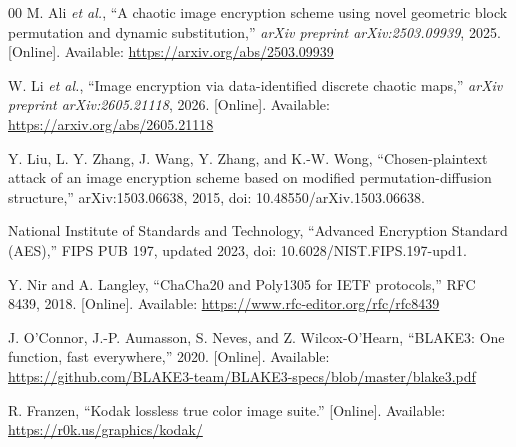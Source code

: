 \documentclass[twocolumn,runningheads]{svjour3}
\begin{document}
\begin{thebibliography}{00}
 M. Ali \emph{et al.}, ``A chaotic image encryption scheme
using novel geometric block permutation and dynamic substitution,''
\emph{arXiv preprint arXiv:2503.09939}, 2025. [Online]. Available:
\url{https://arxiv.org/abs/2503.09939}

 W. Li \emph{et al.}, ``Image encryption via data-identified
discrete chaotic maps,'' \emph{arXiv preprint arXiv:2605.21118}, 2026.
[Online]. Available: \url{https://arxiv.org/abs/2605.21118}

 Y. Liu, L. Y. Zhang, J. Wang, Y. Zhang, and K.-W. Wong,
``Chosen-plaintext attack of an image encryption scheme based on modified
permutation-diffusion structure,'' arXiv:1503.06638, 2015,
doi: 10.48550/arXiv.1503.06638.

 National Institute of Standards and Technology,
``Advanced Encryption Standard (AES),'' FIPS PUB 197, updated 2023,
doi: 10.6028/NIST.FIPS.197-upd1.

 Y. Nir and A. Langley, ``ChaCha20 and Poly1305 for IETF
protocols,'' RFC 8439, 2018. [Online]. Available:
\url{https://www.rfc-editor.org/rfc/rfc8439}

 J. O'Connor, J.-P. Aumasson, S. Neves, and
Z. Wilcox-O'Hearn, ``BLAKE3: One function, fast everywhere,'' 2020.
[Online]. Available:
\url{https://github.com/BLAKE3-team/BLAKE3-specs/blob/master/blake3.pdf}

 R. Franzen, ``Kodak lossless true color image suite.''
[Online]. Available: \url{https://r0k.us/graphics/kodak/}
\end{thebibliography}
\end{document}
